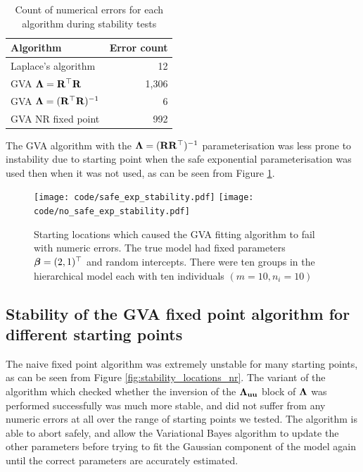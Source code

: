 \documentclass{amsart}[12pt]
\begin{document}
			\begin{table}
				\caption{Count of numerical errors for each algorithm during stability tests}
				\label{tab:stability_results}
				\begin{tabular}{|l|r|}
					\hline
					Algorithm                            & Error count \\
					\hline
					Laplace's algorithm                  & 12          \\
					GVA ${\boldsymbol \Lambda} = {\bf R}^\top {\bf R}$        & 1,306       \\
					GVA ${\boldsymbol \Lambda} = ({\bf R}^\top {\bf R})^{-1}$ & 6           \\
					GVA NR fixed point                   & 992         \\
					\hline
				\end{tabular}
			\end{table}

			The GVA algorithm with the ${\boldsymbol \Lambda} = ({\bf R} {\bf R}^\top)^{-1}$ parameterisation was less prone to
			instability due to starting point when the safe exponential parameterisation was used then when it was
			not used, as can be seen from Figure \ref{fig:stability_locations_gva}. %
					
			\begin{figure}
				\label{fig:stability_locations_gva}
				\caption{Starting locations which caused the GVA fitting algorithm to fail with numeric errors. The true model had fixed parameters ${\boldsymbol \beta} = (2, 1)^\top$ and random intercepts. There were ten groups in the
					hierarchical model each	with ten individuals $(m=10, n_i=10)$}
				\texttt{[image: code/safe\_exp\_stability.pdf]}
				\texttt{[image: code/no\_safe\_exp\_stability.pdf]}
			\end{figure}

			\subsection{Stability of the GVA fixed point algorithm for different starting points}

			The naive fixed point algorithm was extremely unstable for many starting points, as can be seen from
			Figure \ref{fig:stability_locations_nr}. The variant of the algorithm which checked whether the
			inversion of the ${\boldsymbol \Lambda}_{{\bf u} {\bf u}}$ block of ${\boldsymbol \Lambda}$ was performed successfully was much more
			stable, and did not suffer from any numeric errors at all over the range of starting points we tested.
			The algorithm is able to abort safely, and allow the Variational Bayes algorithm to update the other
			parameters before trying to fit the Gaussian component of the model again until the correct parameters
			are accurately estimated.
\end{document}
